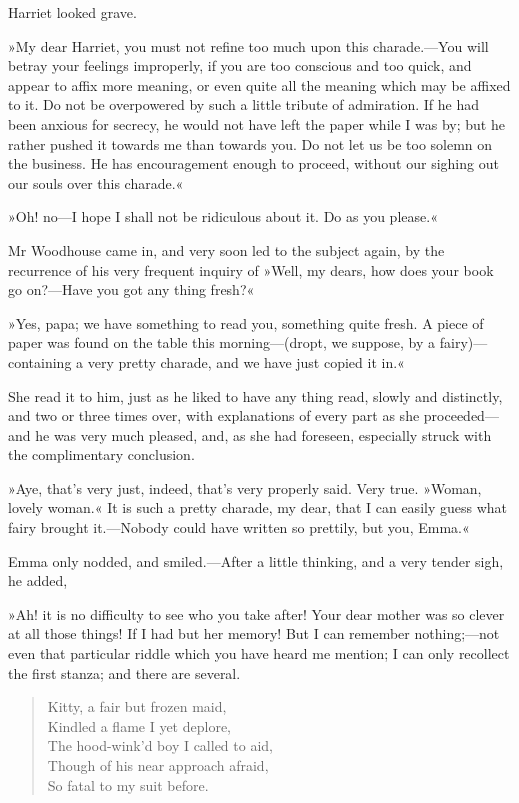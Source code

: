 Harriet looked grave.

»My dear Harriet, you must not refine too much upon this charade.—You will betray your feelings improperly, if you are too conscious and too quick, and appear to affix more meaning, or even quite all the meaning which may be affixed to it. Do not be overpowered by such a little tribute of admiration. If he had been anxious for secrecy, he would not have left the paper while I was by; but he rather pushed it towards me than towards you. Do not let us be too solemn on the business. He has encouragement enough to proceed, without our sighing out our souls over this charade.«

»Oh! no—I hope I shall not be ridiculous about it. Do as you please.«

Mr Woodhouse came in, and very soon led to the subject again, by the recurrence of his very frequent inquiry of »Well, my dears, how does your book go on?—Have you got any thing fresh?«

»Yes, papa; we have something to read you, something quite fresh. A piece of paper was found on the table this morning—(dropt, we suppose, by a fairy)—containing a very pretty charade, and we have just copied it in.«

She read it to him, just as he liked to have any thing read, slowly and distinctly, and two or three times over, with explanations of every part as she proceeded—and he was very much pleased, and, as she had foreseen, especially struck with the complimentary conclusion.

»Aye, that's very just, indeed, that's very properly said. Very true. »Woman, lovely woman.« It is such a pretty charade, my dear, that I can easily guess what fairy brought it.—Nobody could have written so prettily, but you, Emma.«

Emma only nodded, and smiled.—After a little thinking, and a very tender sigh, he added,

»Ah! it is no difficulty to see who you take after! Your dear mother was so clever at all those things! If I had but her memory! But I can remember nothing;—not even that particular riddle which you have heard me mention; I can only recollect the first stanza; and there are several.

 \makeatletter
{}
{%
	


}{%
	\clearpage 
	
}
\makeatother

\begin{samepage}
\begin{verse}
Kitty, a fair but frozen maid,\\
    Kindled a flame I yet deplore,\\
The hood-wink'd boy I called to aid,\\
Though of his near approach afraid,\\
    So fatal to my suit before.\\
	\end{verse}
\end{samepage}

